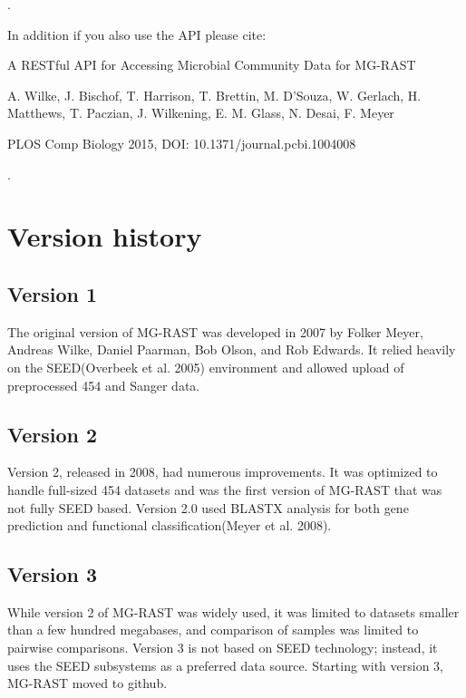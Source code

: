 \documentclass[letterpaper,10pt,english]{sphinxmanual}
\begin{document}

.

\begin{DUlineblock}{0em}
\item[] In addition if you also use the API please cite:
\item[] A RESTful API for Accessing Microbial Community Data for MG-RAST
\item[] A. Wilke, J. Bischof, T. Harrison, T. Brettin, M. D’Souza, W. Gerlach,
H. Matthews, T. Paczian, J. Wilkening, E. M. Glass, N. Desai, F. Meyer
\item[] PLOS Comp Biology 2015, DOI: 10.1371/journal.pcbi.1004008
\end{DUlineblock}


.


\section{Version history}
\label{\detokenize{user_manual:version-history}}

\subsection{Version 1}
\label{\detokenize{user_manual:version-1}}
The original version of MG-RAST was developed in 2007 by Folker Meyer,
Andreas Wilke, Daniel Paarman, Bob Olson, and Rob Edwards. It relied
heavily on the SEED(Overbeek et al. 2005) environment and allowed upload
of preprocessed 454 and Sanger data.


\subsection{Version 2}
\label{\detokenize{user_manual:version-2}}
Version 2, released in 2008, had numerous improvements. It was optimized
to handle full-sized 454 datasets and was the first version of MG-RAST
that was not fully SEED based. Version 2.0 used BLASTX analysis for both
gene prediction and functional classification(Meyer et al. 2008).


\subsection{Version 3}
\label{\detokenize{user_manual:version-3}}
While version 2 of MG-RAST was widely used, it was limited to datasets
smaller than a few hundred megabases, and comparison of samples was
limited to pairwise comparisons. Version 3 is not based on SEED
technology; instead, it uses the SEED subsystems as a preferred data
source. Starting with version 3, MG-RAST moved to github.
\end{document}

